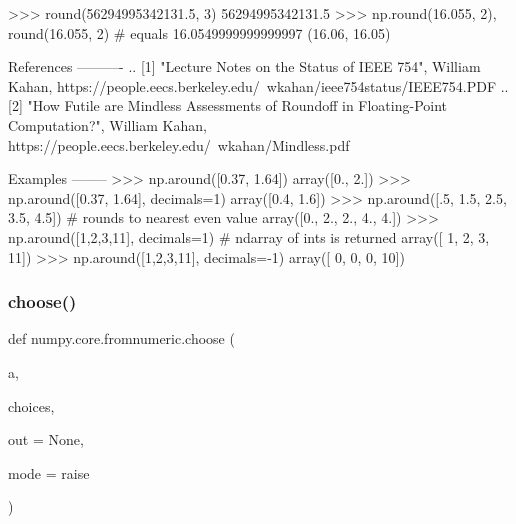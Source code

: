 \begin{DoxyVerb}
    >>> round(56294995342131.5, 3)
    56294995342131.5
    >>> np.round(16.055, 2), round(16.055, 2)  # equals 16.0549999999999997
    (16.06, 16.05)


References
----------
.. [1] "Lecture Notes on the Status of IEEE 754", William Kahan,
       https://people.eecs.berkeley.edu/~wkahan/ieee754status/IEEE754.PDF
.. [2] "How Futile are Mindless Assessments of
       Roundoff in Floating-Point Computation?", William Kahan,
       https://people.eecs.berkeley.edu/~wkahan/Mindless.pdf

Examples
--------
>>> np.around([0.37, 1.64])
array([0.,  2.])
>>> np.around([0.37, 1.64], decimals=1)
array([0.4,  1.6])
>>> np.around([.5, 1.5, 2.5, 3.5, 4.5]) # rounds to nearest even value
array([0.,  2.,  2.,  4.,  4.])
>>> np.around([1,2,3,11], decimals=1) # ndarray of ints is returned
array([ 1,  2,  3, 11])
>>> np.around([1,2,3,11], decimals=-1)
array([ 0,  0,  0, 10])\end{DoxyVerb}
 \mbox{\label{namespacenumpy_1_1core_1_1fromnumeric_a8c4560c1ebb6f90c304bb49141f69ce3}} 
\subsubsection{\texorpdfstring{choose()}{choose()}}
{\footnotesize\ttfamily def numpy.\+core.\+fromnumeric.\+choose (\begin{DoxyParamCaption}\item[{}]{a,  }\item[{}]{choices,  }\item[{}]{out = {\ttfamily None},  }\item[{}]{mode = {\ttfamily \textquotesingle{}raise\textquotesingle{}} }\end{DoxyParamCaption})}

